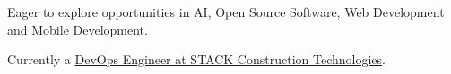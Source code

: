 \vspace{1pc}

\begin{center}
	\noindent Eager to explore opportunities in AI, Open Source Software, Web Development and Mobile Development.
	
	Currently a \underline{DevOps Engineer at STACK Construction Technologies}.
\end{center}
\vspace{1pc}